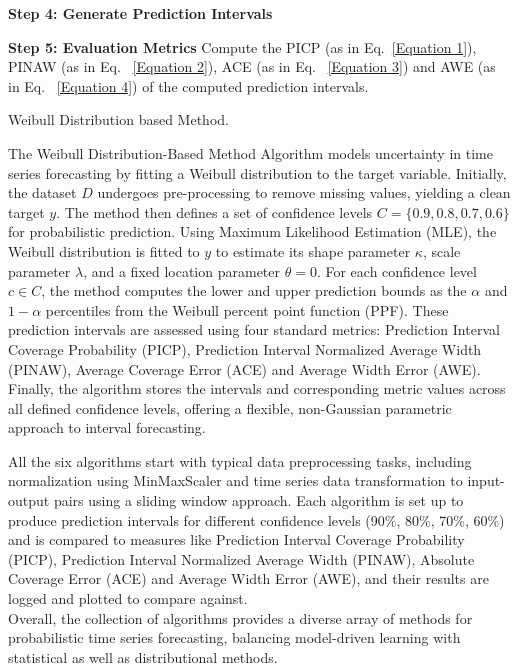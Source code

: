 \begin{itemize}
\begin{algorithm}[H]
        \textbf{Step 4: Generate Prediction Intervals}\\
    
        \textbf{Step 5: Evaluation Metrics} Compute the PICP (as in Eq.~\eqref{Equation 1}), PINAW (as in Eq. ~\eqref{Equation 2}), ACE (as in Eq. ~\eqref{Equation 3}) and AWE (as in Eq. ~\eqref{Equation 4}) of the computed prediction intervals.
        \caption{Weibull Distribution based Method.}
        \end{algorithm}

        The Weibull Distribution-Based Method Algorithm models uncertainty in time series forecasting by fitting a Weibull distribution to the target variable. Initially, the dataset $D$ undergoes pre-processing to remove missing values, yielding a clean target $y$. The method then defines a set of confidence levels $C = \{0.9, 0.8, 0.7, 0.6\}$ for probabilistic prediction. Using Maximum Likelihood Estimation (MLE), the Weibull distribution is fitted to $y$ to estimate its shape parameter $\kappa$, scale parameter $\lambda$, and a fixed location parameter $\theta = 0$. For each confidence level $c \in C$, the method computes the lower and upper prediction bounds as the $\alpha$ and $1-\alpha$ percentiles from the Weibull percent point function (PPF). These prediction intervals are assessed using four standard metrics: Prediction Interval Coverage Probability (PICP), Prediction Interval Normalized Average Width (PINAW), Average Coverage Error (ACE) and Average Width Error (AWE). Finally, the algorithm stores the intervals and corresponding metric values across all defined confidence levels, offering a flexible, non-Gaussian parametric approach to interval forecasting.

\end{itemize}
All the six algorithms start with typical data preprocessing tasks, including normalization using MinMaxScaler and time series data transformation to input-output pairs using a sliding window approach. Each algorithm is set up to produce prediction intervals for different confidence levels (90\%, 80\%, 70\%, 60\%) and is compared to measures like Prediction Interval Coverage Probability (PICP), Prediction Interval Normalized Average Width (PINAW), Absolute Coverage Error (ACE) and Average Width Error (AWE), and their results are logged and plotted to compare against. 
\\ Overall, the collection of algorithms provides a diverse array of methods for probabilistic time series forecasting, balancing model-driven learning with statistical as well as distributional methods.

